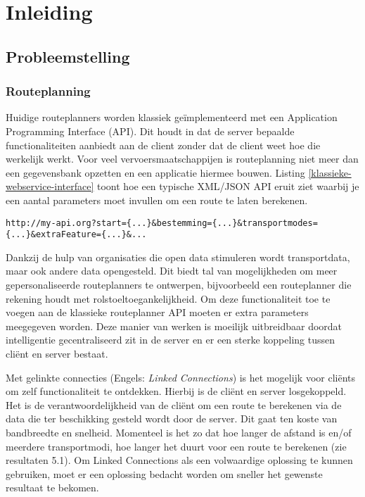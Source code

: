
\chapter{Inleiding}

\section{Probleemstelling}

\subsection{Routeplanning}
Huidige routeplanners worden klassiek ge\"implementeerd met een Application Programming Interface (API). Dit houdt in dat de server bepaalde functionaliteiten aanbiedt aan de client zonder dat de client weet hoe die werkelijk werkt. Voor veel vervoersmaatschappijen is routeplanning niet meer dan een gegevensbank opzetten en een applicatie hiermee bouwen. Listing \ref{klassieke-webservice-interface} toont hoe een typische XML/JSON API eruit ziet waarbij je een aantal parameters moet invullen om een route te laten berekenen.\\

\begin{lstlisting}[label=klassieke-webservice-interface,caption=Klassieke webservice interface]
http://my-api.org?start={...}&bestemming={...}&transportmodes={...}&extraFeature={...}&...
\end{lstlisting}

Dankzij de hulp van organisaties die open data stimuleren wordt transportdata, maar ook andere data opengesteld. Dit biedt tal van mogelijkheden om meer gepersonaliseerde routeplanners te ontwerpen, bijvoorbeeld een routeplanner die rekening houdt met rolstoeltoegankelijkheid. Om deze functionaliteit toe te voegen aan de klassieke routeplanner API moeten er extra parameters meegegeven worden. Deze manier van werken is moeilijk uitbreidbaar doordat intelligentie gecentraliseerd zit in de server en er een sterke koppeling tussen cli\"ent en server bestaat.


Met gelinkte connecties (Engels: \textit{Linked Connections}) is het mogelijk voor cli\"ents om zelf functionaliteit te ontdekken. Hierbij is de cli\"ent en server losgekoppeld. Het is de verantwoordelijkheid van de cli\"ent om een route te berekenen via de data die ter beschikking gesteld wordt door de server. Dit gaat ten koste van bandbreedte en snelheid. Momenteel is het zo dat hoe langer de afstand is en/of meerdere transportmodi, hoe langer het duurt voor een route te berekenen (zie resultaten 5.1). Om Linked Connections als een volwaardige oplossing te kunnen gebruiken, moet er een oplossing bedacht worden om sneller het gewenste resultaat te bekomen.

